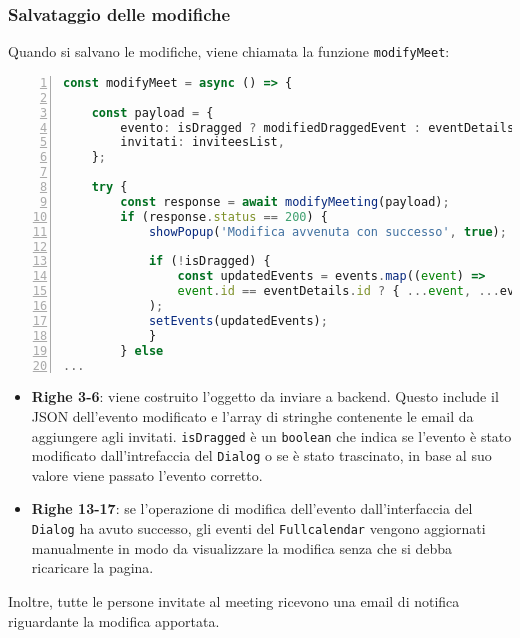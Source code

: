 \subsubsection{Salvataggio delle modifiche}
Quando si salvano le modifiche, viene chiamata la funzione \texttt{modifyMeet}:
\begin{lstlisting}[language=typescript, frame=lines, basicstyle=\ttfamily\scriptsize, numbers=left]
const modifyMeet = async () => {

    const payload = {
        evento: isDragged ? modifiedDraggedEvent : eventDetails,
        invitati: inviteesList,
    };

    try {
        const response = await modifyMeeting(payload);
        if (response.status == 200) {
            showPopup('Modifica avvenuta con successo', true);
            
            if (!isDragged) {
                const updatedEvents = events.map((event) =>
                event.id == eventDetails.id ? { ...event, ...eventDetails } : event
            );
            setEvents(updatedEvents);
            }
        } else
...
\end{lstlisting}
\begin{itemize}
    \item \textbf{Righe 3-6}: viene costruito l'oggetto da inviare a backend. Questo include il JSON dell'evento modificato e l'array
    di stringhe contenente le email da aggiungere agli invitati. \texttt{isDragged} è un \texttt{boolean} che indica se l'evento
    è stato modificato dall'intrefaccia del \texttt{Dialog} o se è stato trascinato, in base al suo valore viene passato 
    l'evento corretto.
    
    \item \textbf{Righe 13-17}: se l'operazione di modifica dell'evento dall'interfaccia del \texttt{Dialog} ha
    avuto successo, gli eventi del \texttt{Fullcalendar} vengono aggiornati manualmente in modo da visualizzare la modifica senza che 
    si debba ricaricare la pagina.
\end{itemize}
Inoltre, tutte le persone invitate al meeting ricevono una email di notifica riguardante la modifica apportata.